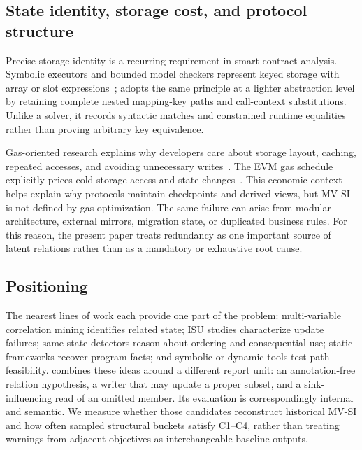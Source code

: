 \subsection{State identity, storage cost, and protocol structure}
\label{s:related-state}

Precise storage identity is a recurring requirement in smart-contract analysis. Symbolic executors and bounded model checkers represent keyed storage with array or slot expressions~\cite{mythril,manticore,frank2020ethbmc}; \sys adopts the same principle at a lighter abstraction level by retaining complete nested mapping-key paths and call-context substitutions. Unlike a solver, it records syntactic matches and constrained runtime equalities rather than proving arbitrary key equivalence.

Gas-oriented research explains why developers care about storage layout, caching, repeated accesses, and avoiding unnecessary writes~\cite{he2025save}. The EVM gas schedule explicitly prices cold storage access and state changes~\cite{eip2929,eip2200}. This economic context helps explain why protocols maintain checkpoints and derived views, but MV-SI is not defined by gas optimization. The same failure can arise from modular architecture, external mirrors, migration state, or duplicated business rules. For this reason, the present paper treats redundancy as one important source of latent relations rather than as a mandatory or exhaustive root cause.

\subsection{Positioning}
\label{s:related-positioning}

The nearest lines of work each provide one part of the problem: multi-variable correlation mining identifies related state; ISU studies characterize update failures; same-state detectors reason about ordering and consequential use; static frameworks recover program facts; and symbolic or dynamic tools test path feasibility. \sys combines these ideas around a different report unit: an annotation-free relation hypothesis, a writer that may update a proper subset, and a sink-influencing read of an omitted member. Its evaluation is correspondingly internal and semantic. We measure whether those candidates reconstruct historical MV-SI and how often sampled structural buckets satisfy C1--C4, rather than treating warnings from adjacent objectives as interchangeable baseline outputs.
